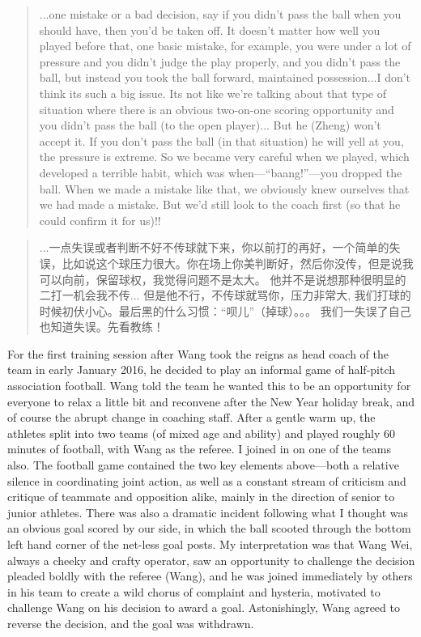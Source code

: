 \begin{CJK}{UTF8}{gbsn}
    \begin{quotation}
      ...one mistake or a bad decision, say if you didn't pass the ball when you should have, then you'd be taken off.  It doesn't matter how well you played before that, one basic mistake, for example, you were under a lot of pressure and you didn't judge the play properly, and you didn't pass the ball, but instead you took the ball forward, maintained possession...I don't think its such a big issue.
      Its not like we're talking about that type of situation where there is an obvious two-on-one scoring opportunity and you didn't pass the ball (to the open player)...
      But he (Zheng) won't accept it.  If you don't pass the ball (in that situation) he will yell at you, the pressure is extreme.  So we became very careful when we played, which developed a terrible habit, which was when---``baang!''---you dropped the ball. When we made a mistake like that, we obviously knew ourselves that we had made a mistake.  But we'd still look to the coach first (so that he could confirm it for us)!!
    \end{quotation}

    \begin{quotation}
      ...一点失误或者判断不好不传球就下来，你以前打的再好，一个简单的失误，比如说这个球压力很大。你在场上你美判断好，然后你没传，但是说我可以向前，保留球权，我觉得问题不是太大。
      他并不是说想那种很明显的二打一机会我不传...
      但是他不行，不传球就骂你，压力非常大, 我们打球的时候初伏小心。最后黑的什么习惯：“呗儿”（掉球）。。。 我们一失误了自己也知道失误。先看教练！
    \end{quotation}




For the first training session after Wang took the reigns as head coach of the team in early January 2016, he decided to play an informal game of half-pitch association football.  Wang told the team he wanted this to be an opportunity for everyone to relax a little bit and reconvene after the New Year holiday break, and of course the abrupt change in coaching staff. After a gentle warm up, the athletes split into two teams (of mixed age and ability) and played roughly 60 minutes of football, with Wang as the referee.  I joined in on one of the teams also.  The football game contained the two key elements above---both a relative silence in coordinating joint action, as well as a constant stream of criticism and critique of teammate and opposition alike, mainly in the direction of senior to junior athletes.  There was also a dramatic incident following what I thought was an obvious goal scored by our side, in which the ball scooted through the bottom left hand corner of the net-less goal posts. My interpretation was that Wang Wei, always a cheeky and crafty operator, saw an opportunity to challenge the decision  pleaded boldly with the referee (Wang), and he was joined immediately by others in his team to create a wild chorus of complaint and hysteria, motivated to challenge Wang on his decision to award a goal.  Astonishingly, Wang agreed to reverse the decision, and the goal was withdrawn.


\end{CJK}
